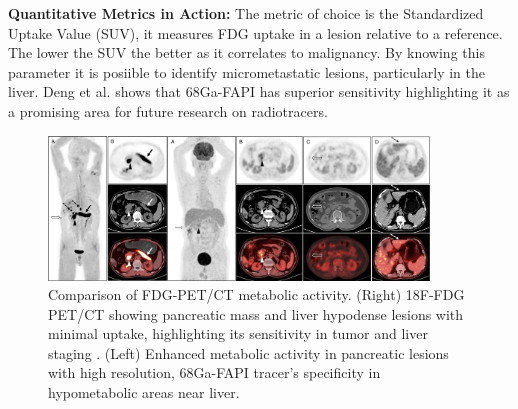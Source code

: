 \begin{multicols}{2}
\textbf{Quantitative Metrics in Action:} The metric of choice is the Standardized Uptake Value (SUV), it measures FDG uptake in a lesion relative to a reference. The lower the SUV the better as it correlates to malignancy. By knowing this parameter it is posiible to identify micrometastatic lesions, particularly in the liver. Deng et al. shows that 68Ga-FAPI has superior sensitivity highlighting it as a promising area for future research on radiotracers.\cite{Deng2021}

\end{multicols}
\begin{figure}[ht]
	\centering
	\includegraphics[width=0.9\textwidth]{assets/DengMerged.png}
	\caption{Comparison of FDG-PET/CT metabolic activity. (Right) 18F-FDG PET/CT showing pancreatic mass and liver hypodense lesions with minimal uptake, highlighting its sensitivity in tumor and liver staging \cite{Deng2021}. (Left) Enhanced metabolic activity in pancreatic lesions with high resolution, 68Ga-FAPI tracer’s specificity in hypometabolic areas near liver\cite{Deng2021}.}
	\label{fig:DengMerged}
\end{figure}




